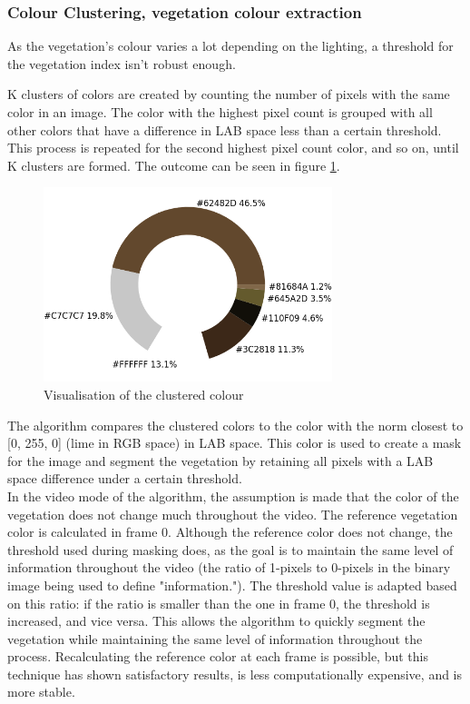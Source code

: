 \subsubsection{Colour Clustering, vegetation colour extraction}

As the vegetation’s colour varies a lot depending on the lighting, a threshold for the vegetation index isn't robust enough. 

K clusters of colors are created by counting the number of pixels with the same color in an image. The color with the highest pixel count is grouped with all other colors that have a difference in LAB space less than a certain threshold. This process is repeated for the second highest pixel count color, and so on, until K clusters are formed. The outcome can be seen in figure \ref{pics:ColourClus}.

\begin{figure}[H]
   \centering
   \includegraphics[width=0.75\textwidth]{images/donut.png}
   \caption{Visualisation of the clustered colour}
   \label{pics:ColourClus}
\end{figure}

The algorithm compares the clustered colors to the color with the norm closest  to [0, 255, 0] (lime in RGB space) in LAB space. This color is used to create a mask for the image and segment the vegetation by retaining all pixels with a LAB space difference under a certain threshold. \\


In the video mode of the algorithm, the assumption is made that the color of the vegetation does not change much throughout the video. The reference vegetation color is calculated in frame 0. Although the reference color does not change, the threshold used during masking does, as the goal is to maintain the same level of information throughout the video (the ratio of 1-pixels to 0-pixels in the binary image being used to define "information."). The threshold value is adapted based on this ratio: if the ratio is smaller than the one in frame 0, the threshold is increased, and vice versa. This allows the algorithm to quickly segment the vegetation while maintaining the same level of information throughout the process. Recalculating the reference color at each frame is possible, but this technique has shown satisfactory results, is less computationally expensive, and is more stable. 

